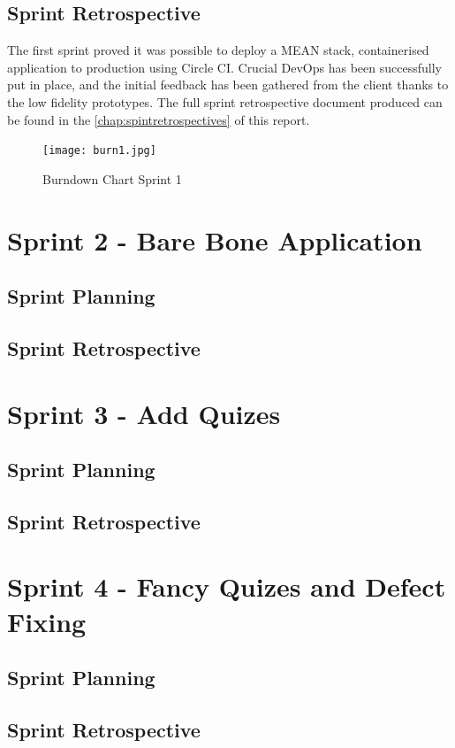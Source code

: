 \subsection{Sprint Retrospective}
The first sprint proved it was possible to deploy a MEAN stack, containerised application
to production using Circle CI. Crucial DevOps has been successfully put in place, and the
initial feedback has been gathered from the client thanks to the low fidelity prototypes.
The full sprint retrospective document produced can be found in the \autoref{chap:spintretrospectives} of this report.

\begin{figure}[ht]
    \centering
    \texttt{[image: burn1.jpg]}
    \caption{Burndown Chart Sprint 1}
    \label{fig:burn1}
\end{figure}

\section{Sprint 2 - Bare Bone Application}
\subsection{Sprint Planning}

\subsection{Sprint Retrospective}
\section{Sprint 3 - Add Quizes}
\subsection{Sprint Planning}

\subsection{Sprint Retrospective}
\section{Sprint 4 - Fancy Quizes and Defect Fixing}
\subsection{Sprint Planning}

\subsection{Sprint Retrospective}
